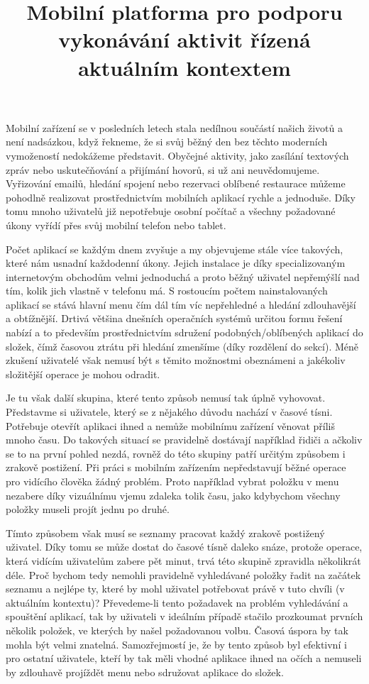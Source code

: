 \documentclass[thesis=M,czech]{FITthesis}[2012/06/26]
\title{Mobilní platforma pro podporu vykonávání aktivit řízená aktuálním kontextem}
\begin{document}

\begin{introduction}
Mobilní zařízení se v posledních letech stala nedílnou součástí našich životů a není nadsázkou, když řekneme, že si svůj běžný den bez těchto moderních vymožeností nedokážeme představit. Obyčejné aktivity, jako zasílání textových zpráv nebo uskutečňování a přijímání hovorů, si už ani neuvědomujeme. Vyřizování emailů, hledání spojení nebo rezervaci oblíbené restaurace můžeme pohodlně realizovat prostřednictvím mobilních aplikací rychle a jednoduše. Díky tomu mnoho uživatelů již nepotřebuje osobní počítač a všechny požadované úkony vyřídí přes svůj mobilní telefon nebo tablet.

Počet aplikací se každým dnem zvyšuje a my objevujeme stále více takových, které nám usnadní každodenní úkony. Jejich instalace je díky specializovaným internetovým obchodům velmi jednoduchá a proto běžný uživatel nepřemýšlí nad tím, kolik jich vlastně v telefonu má. S rostoucím počtem nainstalovaných aplikací se stává hlavní menu čím dál tím víc nepřehledné a hledání zdlouhavější a obtížnější. Drtivá většina dnešních operačních systémů určitou formu řešení nabízí a to především prostřednictvím sdružení podobných/oblíbených aplikací do složek, čímž časovou ztrátu při hledání zmenšíme (díky rozdělení do sekcí). Méně zkušení uživatelé však nemusí být s těmito možnostmi obeznámeni a jakékoliv složitější operace je mohou odradit.

Je tu však další skupina, které tento způsob nemusí tak úplně vyhovovat. Představme si uživatele, který se z nějakého důvodu nachází v časové tísni. Potřebuje otevřít aplikaci ihned a nemůže mobilnímu zařízení věnovat příliš mnoho času. Do takových situací se pravidelně dostávají například řidiči a ačkoliv se to na první pohled nezdá, rovněž do této skupiny patří určitým způsobem i zrakově postižení. Při práci s mobilním zařízením nepředstavují běžné operace pro vidícího člověka žádný problém. Proto například vybrat položku v menu nezabere díky vizuálnímu vjemu zdaleka tolik času, jako kdybychom všechny položky museli projít jednu po druhé.

Tímto způsobem však musí se seznamy pracovat každý zrakově postižený uživatel. Díky tomu se může dostat do časové tísně daleko snáze, protože operace, která vidícím uživatelům zabere pět minut, trvá této skupině zpravidla několikrát déle. Proč bychom tedy nemohli pravidelně vyhledávané položky řadit na začátek seznamu a nejlépe ty, které by mohl uživatel potřebovat právě v tuto chvíli (v aktuálním kontextu)? Převedeme-li tento požadavek na problém vyhledávání a spouštění aplikací, tak by uživateli v ideálním případě stačilo prozkoumat prvních několik položek, ve kterých by našel požadovanou volbu. Časová úspora by tak mohla být velmi znatelná. Samozřejmostí je, že by tento způsob byl efektivní i pro ostatní uživatele, kteří by tak měli vhodné aplikace ihned na očích a nemuseli by zdlouhavě projíždět menu nebo sdružovat aplikace do složek.


\end{introduction}
\end{document}
